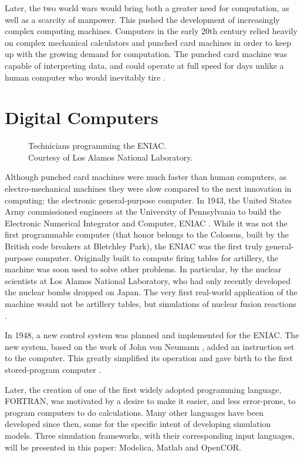 \documentclass[\rootfolder/main.tex]{subfiles}
\begin{document}
Later, the two world wars would bring both a greater need for computation, as well as a scarcity of manpower.
This pushed the development of increasingly complex computing machines.
Computers in the early 20th century relied heavily on complex mechanical calculators and punched card machines in order to keep up with the growing demand for computation.
The punched card machine was capable of interpreting data, and could operate at full speed for days unlike a human computer who would inevitably tire \cite{carr}.

\section{Digital Computers}

\begin{wrapfigure}{R}{0.6\columnwidth}
    \caption[Technicians programming the ENIAC.]
            {Technicians programming the ENIAC. \\ Courtesy of Los Alamos National Laboratory\label{fig:eniac}.}
\end{wrapfigure}

Although punched card machines were much faster than human computers, as electro-mechanical machines they were slow compared to the next innovation in computing: the electronic general-purpose computer.
In 1943, the United States Army commissioned engineers at the University of Pennsylvania to build the Electronic Numerical Integrator and Computer, ENIAC \cite{sep-computing-history}\cite{reed1952}.
While it was not the first programmable computer (that honor belongs to the Colossus, built by the British code breakers at Bletchley Park\cite{winegrad1996}), the ENIAC was the first truly general-purpose computer.
Originally built to compute firing tables for artillery, the machine was soon used to solve other problems. 
In particular, by the nuclear scientists at Los Alamos National Laboratory, who had only recently developed the nuclear bombs dropped on Japan.
The very first real-world application of the machine would not be artillery tables, but simulations of nuclear fusion reactions \cite{AtomicHeritageFoundation}.

In 1948, a new control system was planned and implemented for the ENIAC.
The new system, based on the work of John von Neumann \cite{VonNeumann1993} \cite{Haigh2014a}, added an instruction set to the computer.
This greatly simplified its operation and gave birth to the first stored-program computer \cite{Rope2007}.

Later, the creation of one of the first widely adopted programming language, FORTRAN, was motivated by a desire to make it easier, and less error-prone, to program computers to do calculations.
Many other languages have been developed since then, some for the specific intent of developing simulation models.
Three simulation frameworks, with their corresponding input languages, will be presented in this paper: Modelica, Matlab and OpenCOR.
\end{document}
